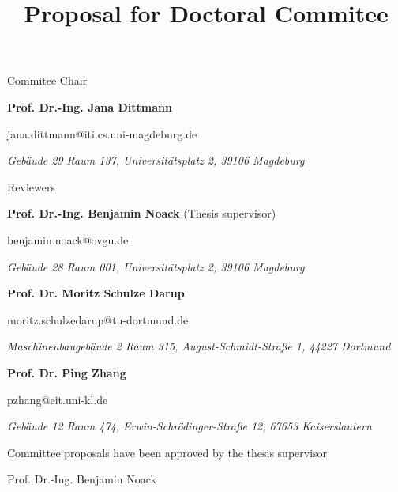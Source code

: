 \documentclass{article}
\title{Proposal for Doctoral Commitee}
\author{}
\date{}
\begin{document}
\maketitle
\thispagestyle{empty}

\begin{center}
    \vspace{\baselineskip}
    \Large
    Commitee Chair
    \vspace{\baselineskip}
\end{center}
\normalsize
\textbf{Prof. Dr.-Ing. Jana Dittmann}

\vspace{0.5\baselineskip}
jana.dittmann@iti.cs.uni-magdeburg.de

\vspace{0.5\baselineskip}
\textit{Gebäude 29 Raum 137, Universitätsplatz 2, 39106 Magdeburg}


\begin{center}
    \vspace{\baselineskip}
    \Large
    Reviewers
    \vspace{\baselineskip}
\end{center}
\normalsize
\textbf{Prof. Dr.-Ing. Benjamin Noack} (Thesis supervisor)

\vspace{0.5\baselineskip}
benjamin.noack@ovgu.de

\vspace{0.5\baselineskip}
\textit{Gebäude 28 Raum 001, Universitätsplatz 2, 39106 Magdeburg}

\vspace{2\baselineskip}
\textbf{Prof. Dr. Moritz Schulze Darup}

\vspace{0.5\baselineskip}
moritz.schulzedarup@tu-dortmund.de

\vspace{0.5\baselineskip}
\textit{Maschinenbaugebäude 2 Raum 315, August-Schmidt-Straße 1, 44227 Dortmund}

\vspace{2\baselineskip}
\textbf{Prof. Dr. Ping Zhang}

\vspace{0.5\baselineskip}
pzhang@eit.uni-kl.de

\vspace{0.5\baselineskip}
\textit{Gebäude 12 Raum 474, Erwin-Schrödinger-Straße 12, 67653 Kaiserslautern}


\vfill
Committee proposals have been approved by the thesis supervisor

\vspace{3cm}
Prof. Dr.-Ing. Benjamin Noack
\end{document}
